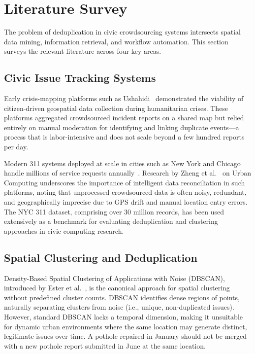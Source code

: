 \documentclass[conference]{IEEEtran}
\begin{document}
\section{Literature Survey}

The problem of deduplication in civic crowdsourcing systems intersects spatial data mining, information retrieval, and workflow automation. This section surveys the relevant literature across four key areas.

\subsection{Civic Issue Tracking Systems}

Early crisis-mapping platforms such as Ushahidi~\cite{b3} demonstrated the viability of citizen-driven geospatial data collection during humanitarian crises. These platforms aggregated crowdsourced incident reports on a shared map but relied entirely on manual moderation for identifying and linking duplicate events---a process that is labor-intensive and does not scale beyond a few hundred reports per day.

Modern 311 systems deployed at scale in cities such as New York and Chicago handle millions of service requests annually~\cite{b4}. Research by Zheng et al.~\cite{b2} on Urban Computing underscores the importance of intelligent data reconciliation in such platforms, noting that unprocessed crowdsourced data is often noisy, redundant, and geographically imprecise due to GPS drift and manual location entry errors. The NYC 311 dataset, comprising over 30 million records, has been used extensively as a benchmark for evaluating deduplication and clustering approaches in civic computing research.

\subsection{Spatial Clustering and Deduplication}

Density-Based Spatial Clustering of Applications with Noise (DBSCAN), introduced by Ester et al.~\cite{b5}, is the canonical approach for spatial clustering without predefined cluster counts. DBSCAN identifies dense regions of points, naturally separating clusters from noise (i.e., unique, non-duplicated issues). However, standard DBSCAN lacks a temporal dimension, making it unsuitable for dynamic urban environments where the same location may generate distinct, legitimate issues over time. A pothole repaired in January should not be merged with a new pothole report submitted in June at the same location.
\end{document}
